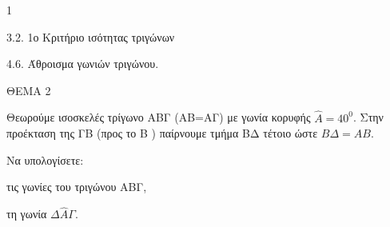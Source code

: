 \begin{ylh}{1}
    \item 3.2. 1ο Κριτήριο ισότητας τριγώνων
    \item 4.6. Άθροισμα γωνιών τριγώνου.
\end{ylh}

ΘΕΜΑ 2

Θεωρούμε ισοσκελές τρίγωνο ΑΒΓ (ΑΒ=ΑΓ) με γωνία κορυφής $\widehat{Α} = 40^{0}$. Στην προέκταση της ΓΒ (προς το Β ) παίρνουμε τμήμα ΒΔ τέτοιο ώστε $Β\Delta = ΑΒ$.

Να υπολογίσετε:

\begin{alist}
\item τις γωνίες του τριγώνου ΑΒΓ, 

\item τη γωνία $\Delta\widehat{Α}\Gamma$. 
\end{alist}
